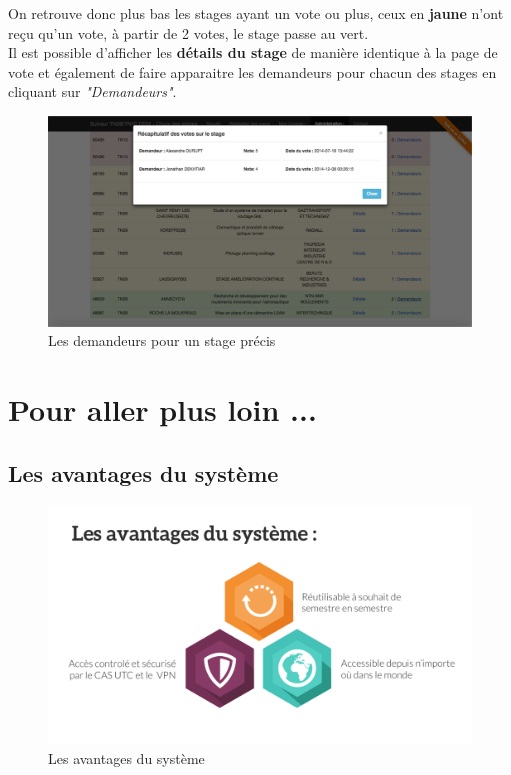 \documentclass[a4paper,titlepage]{scrartcl}
\begin{document}
On retrouve donc plus bas les stages ayant un vote ou plus, ceux en \textbf{jaune} n'ont reçu qu'un vote, à partir de 2 votes, le stage passe au vert.\\

Il est possible d'afficher les \textbf{détails du stage} de manière identique à la page de vote et également de faire apparaitre les demandeurs pour chacun des stages en cliquant sur \textit{"Demandeurs"}.\\


\begin{figure}[H]
	\vspace{-3mm}
	\begin{center}
		\includegraphics[scale=0.33]{Images/admin_voters.png}
		\caption{Les demandeurs pour un stage précis}
		\vspace{-5mm}
	\end{center}
\end{figure}

\clearpage

\section{Pour aller plus loin ...}

\subsection{Les avantages du système}

\begin{figure}[H]
	\vspace{-3mm}
	\begin{center}
		\includegraphics[scale=0.33]{Images/avantages.png}
		\caption{Les avantages du système}
	\end{center}
\end{figure}
\end{document}
